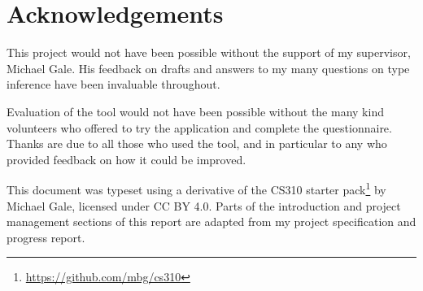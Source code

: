 \documentclass[a4paper,fleqn,oneside,12pt]{report}
\begin{document}
\chapter*{Acknowledgements}\label{id:h.xqaef57orpsv}

This project would not have been possible without the support of my supervisor, Michael Gale. His feedback on drafts and answers to my many questions on type inference have been invaluable throughout.

Evaluation of the tool would not have been possible without the many kind volunteers who offered to try the application and complete the questionnaire. Thanks are due to all those who used the tool, and in particular to any who provided feedback on how it could be improved.

This document was typeset using a derivative of the CS310 starter pack\footnote{\href{https://github.com/mbg/cs310}{https://github.com/mbg/cs310}} by Michael Gale, licensed under CC BY 4.0. Parts of the introduction and project management sections of this report are adapted from my project specification and progress report.



\end{document}
